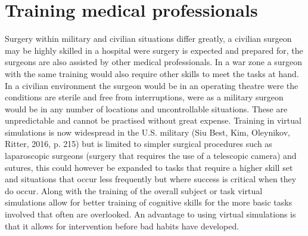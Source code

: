\documentclass[10pt,journal,compsoc]{IEEEtran}
\begin{document}
	\section{Training medical professionals}	
	Surgery within military and civilian situations differ greatly, a civilian surgeon may be highly skilled in a hospital were surgery is expected and prepared for, the surgeons are also assisted by other medical professionals. In a war zone a surgeon with the same training would also require other skills to meet the tasks at hand. In a civilian environment the surgeon would be in an operating theatre were the conditions are sterile and free from interruptions, were as a military surgeon would be in any number of locations and uncontrollable situations. These are unpredictable and cannot be practised without great expense. \newline \newline
	Training in virtual simulations is now widespread in the U.S. military (Siu Best, Kim, Oleynikov, Ritter, 2016, p. 215) but is limited to simpler surgical procedures such as laparoscopic surgeons (surgery that requires the use of a telescopic camera) and sutures, this could however be expanded to tasks that require a higher skill set and situations that occur less frequently but where success is critical when they do occur. Along with the training of the overall subject or task virtual simulations allow for better training of cognitive skills for the more basic tasks involved that often are overlooked. \newline
	An advantage to using virtual simulations is that it allows for intervention before bad habits have developed. 
	
\end{document}
